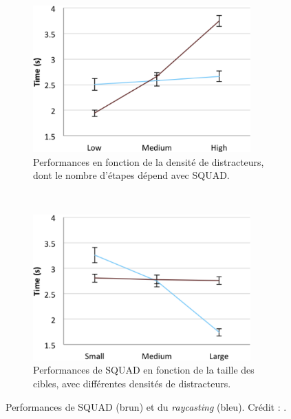 	\begin{figure}[!htbp]
		\begin{subfigure}[t]{0.49\textwidth}
			\centering
			\includegraphics[width=0.92\textwidth]{figures/ch2/squadDensity}
			\caption{Performances en fonction de la densité de distracteurs, dont le nombre d'étapes dépend avec SQUAD.}
			\label{fig:squadDensity}
		\end{subfigure}
		~
		\begin{subfigure}[t]{0.49\textwidth}
			\centering
			\includegraphics[width=0.92\textwidth]{figures/ch2/squadSize}
			\caption{Performances de SQUAD en fonction de la taille des cibles, avec différentes densités de distracteurs.}
			\label{fig:squadSize}
		\end{subfigure}
		\caption[Performances de SQUAD]{Performances de SQUAD (brun) et du \emph{raycasting} (bleu). Crédit : \cite{kopper2011rapid}.}
		\label{fig:squadPerf}
	\end{figure}
	
